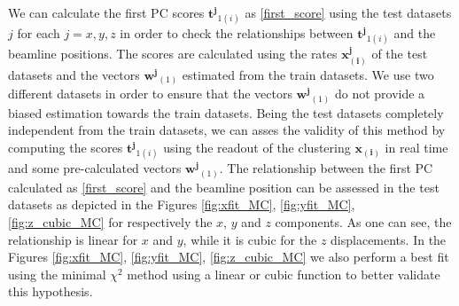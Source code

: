  We can calculate the first PC scores $\mathbf{t^j}_{1(i)}$ as \eqref{first_score} using the test datasets $j$ for each $j=x,y,z$ in order to check the relationships between $\mathbf{t^{j}}_{1(i)}$ and the beamline positions. The scores are calculated using the rates $\mathbf{x^{j}_{(i)}}$ of the test datasets and the vectors $\mathbf{w^{j}}_{(1)}$ estimated from the train datasets. We use two different datasets in order to ensure that the vectors $\mathbf{w^{j}}_{(1)}$ do not provide a biased estimation towards the train datasets. Being the test datasets completely independent from the train datasets, we can asses the validity of this method by computing the scores $\mathbf{t^{j}}_{1(i)}$ using the readout of the clustering $\mathbf{x_{(i)}}$ in real time and some pre-calculated vectors $\mathbf{w^{j}}_{(1)}$. The relationship between the first PC calculated as \eqref{first_score} and the beamline position can be assessed in the test datasets as depicted in the Figures \ref{fig:xfit_MC}, \ref{fig:yfit_MC}, \ref{fig:z_cubic_MC} for respectively the $x$, $y$ and $z$ components. As one can see, the relationship is linear for $x$ and $y$, while it is cubic for the $z$ displacements. In the Figures \ref{fig:xfit_MC}, \ref{fig:yfit_MC}, \ref{fig:z_cubic_MC} we also perform a best fit using the minimal $\chi^2$ method using a linear or cubic function to better validate this hypothesis. 


